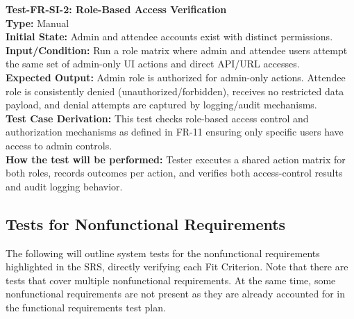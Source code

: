 \documentclass[12pt, titlepage]{article}
\begin{document}
\noindent\textbf{Test-FR-SI-2: Role-Based Access Verification}\\
\textbf{Type:} Manual\\
\textbf{Initial State:} Admin and attendee accounts exist with distinct permissions.\\
\textbf{Input/Condition:} Run a role matrix where admin and attendee users attempt the same set of admin-only UI actions and direct API/URL accesses.\\
\textbf{Expected Output:} Admin role is authorized for admin-only actions. Attendee role is consistently denied (unauthorized/forbidden), receives no restricted data payload, and denial attempts are captured by logging/audit mechanisms.\\
\textbf{Test Case Derivation:} This test checks role-based access control and authorization mechanisms as defined in FR-11 ensuring only specific users have access to admin controls.\\
\textbf{How the test will be performed:} Tester executes a shared action matrix for both roles, records outcomes per action, and verifies both access-control results and audit logging behavior.\\[12pt]


\subsection{Tests for Nonfunctional Requirements}

The following will outline system tests for the nonfunctional requirements highlighted in the SRS, directly verifying each Fit Criterion. Note that there are tests that cover multiple nonfunctional requirements. At the same time, some nonfunctional requirements are not present as they are already accounted for in the functional requirements test plan.
\end{document}

